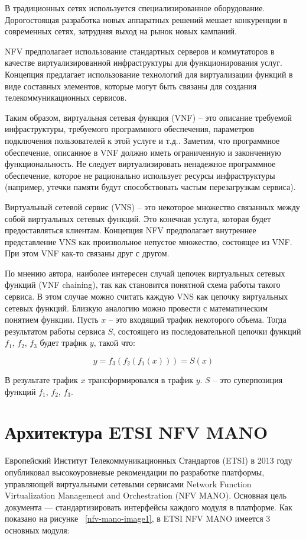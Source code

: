\documentclass[oneside,final,14pt,a4paper]{extreport}
\begin{document}
В традиционных сетях используется специализированное оборудование. Дорогостоящая разработка новых аппаратных решений мешает конкуренции в современных сетях, затрудняя выход на рынок новых кампаний.

NFV предполагает использование стандартных серверов и коммутаторов в качестве виртуализированной инфраструктуры для функционирования услуг. Концепция предлагает использование технологий для виртуализации функций в виде составных элементов, которые могут быть связаны для создания телекоммуникационных сервисов.

Таким образом, виртуальная сетевая функция (VNF) -- это описание требуемой инфраструктуры, требуемого программного обеспечения, параметров подключения пользователей к этой услуге и т.д.. Заметим, что программное обеспечение, описанное в VNF должно иметь ограниченную и законченную функциональность. Не следует виртуализировать ненадежное программное обеспечение, которое не рационально использует ресурсы инфраструктуры (например, утечки памяти будут способствовать частым перезагрузкам сервиса).

Виртуальный сетевой сервис (VNS) -- это некоторое множество связанных между собой виртуальных сетевых функций. Это конечная услуга, которая будет предоставляться клиентам. Концепция NFV предполагает внутреннее представление VNS как произвольное непустое множество, состоящее из VNF. При этом VNF как-то связаны друг с другом.

По мнению автора, наиболее интересен случай цепочек виртуальных сетевых функций (VNF chaining), так как становится понятной схема работы такого сервиса. В этом случае можно считать каждую VNS как цепочку виртуальных сетевых функций. Близкую аналогию можно провести с математическим понятием функции. Пусть $x$ -- это входящий трафик некоторого объема. Тогда результатом работы сервиса $S$, состоящего из последовательной цепочки функций $f_{1}$, $f_{2}$, $f_{3}$ будет трафик $y$, такой что:

\begin{equation}
	\label{eq:service_example}
	y = f_3(f_2(f_1(x))) = S(x)
\end{equation}

В результате трафик $x$ трансформировался в трафик $y$. $S$ -- это суперпозиция функций $f_{1}$, $f_{2}$, $f_{3}$.


\section{Архитектура ETSI NFV MANO}
\label{sec:etsi_nfv_mano}
Европейский Институт Телекоммуникационных Стандартов (ETSI) в 2013 году опубликовал высокоуровневые рекомендации по разработке платформы, управляющей виртуальными сетевыми сервисами Network Function Virtualization Management and Orchestration (NFV MANO). Основная цель документа --- стандартизировать интерфейсы каждого модуля в платформе.\cite{nfv-mano-state1} Как показано на рисунке ~\ref{nfv-mano-image1}, в ETSI NFV MANO имеется 3 основных модуля:
\end{document}
